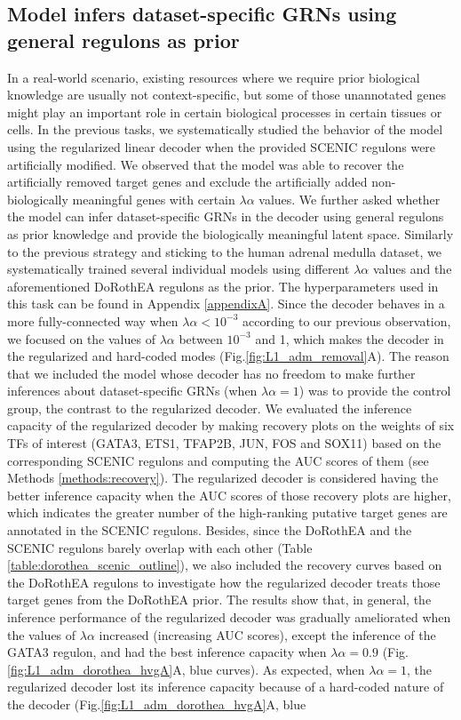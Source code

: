 \subsection{Model infers dataset-specific GRNs using general regulons as prior}\label{sec:L1_dorothea}
In a real-world scenario, existing resources where we require prior biological knowledge are usually not context-specific, but some of those unannotated genes might play an important role in certain biological processes in certain tissues or cells\cite{Seninge2021}. In the previous tasks, we systematically studied the behavior of the model using the regularized linear decoder when the provided SCENIC regulons were artificially modified. We observed that the model was able to recover the artificially removed target genes and exclude the artificially added non-biologically meaningful genes with certain $\lambda\alpha$ values. We further asked whether the model can infer dataset-specific GRNs in the decoder using general regulons as prior knowledge and provide the biologically meaningful latent space. Similarly to the previous strategy and sticking to the human adrenal medulla dataset\cite{Jansky2021}, we systematically trained several individual models using different $\lambda\alpha$ values and the aforementioned DoRothEA\cite{Garcia-Alonso2019} regulons as the prior. The hyperparameters used in this task can be found in Appendix \ref{appendixA}. Since the decoder behaves in a more fully-connected way when $\lambda\alpha < 10^{-3}$ according to our previous observation, we focused on the values of $\lambda\alpha$ between $10^{-3}$ and 1, which makes the decoder in the regularized and hard-coded modes (Fig.\ref{fig:L1_adm_removal}A). The reason that we included the model whose decoder has no freedom to make further inferences about dataset-specific GRNs (when $\lambda\alpha = 1$) was to provide the control group, the contrast to the regularized decoder. We evaluated the inference capacity of the regularized decoder by making recovery plots on the weights of six TFs of interest (GATA3, ETS1, TFAP2B, JUN, FOS and SOX11) based on the corresponding SCENIC regulons and computing the AUC scores of them (see Methods \ref{methods:recovery}). The regularized decoder is considered having the better inference capacity when the AUC scores of those recovery plots are higher, which indicates the greater number of the high-ranking putative target genes are annotated in the SCENIC regulons. Besides, since the DoRothEA and the SCENIC regulons barely overlap with each other (Table \ref{table:dorothea_scenic_outline}), we also included the recovery curves based on the DoRothEA regulons to investigate how the regularized decoder treats those target genes from the DoRothEA prior. The results show that, in general, the inference performance of the regularized decoder was gradually ameliorated when the values of $\lambda\alpha$ increased (increasing AUC scores), except the inference of the GATA3 regulon, and had the best inference capacity when $\lambda\alpha = 0.9$ (Fig.\ref{fig:L1_adm_dorothea_hvgA}A, blue curves). As expected, when $\lambda\alpha = 1$, the regularized decoder lost its inference capacity because of a hard-coded nature of the decoder (Fig.\ref{fig:L1_adm_dorothea_hvgA}A, blue 